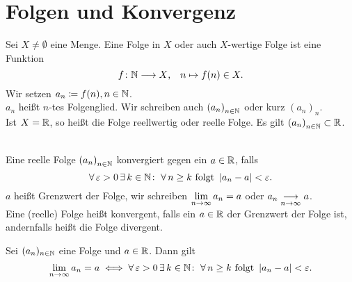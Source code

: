 \documentclass[../ana1.tex]{subfiles}
\begin{document}
\setcounter{section}{6}

\section{Folgen und Konvergenz}

\begin{defi}
	Sei \( X \neq \emptyset \) eine Menge. Eine Folge in \(X \) oder auch \(X \)-wertige Folge
	ist eine Funktion
	\[f \colon \mathbb{N} \longrightarrow X \text{,} \quad n \mapsto f(n) \in X. \]
	Wir setzen \(a_n \coloneqq f(n) \text{,} \, n \in \mathbb{N} \).\\
	\(a_n \) heißt \(n \)-tes Folgenglied. Wir schreiben auch \({(a_n)}_{n \in \mathbb{N}} \)
	oder kurz \({(a_n)}_n \).\\
	Ist \(X = \mathbb{R} \), so heißt die Folge reellwertig oder reelle Folge.
	Es gilt \({(a_n)}_{n\in\mathbb{N}} \subset \mathbb{R} \).
\end{defi}

\begin{defi} \leavevmode \\
	Eine reelle Folge \({(a_n)}_{n \in \mathbb{N}} \) konvergiert gegen ein \(a \in \mathbb{R} \), falls
	\[\forall \, \varepsilon > 0 \, \exists \, k \in \mathbb{N} \colon \; \forall \, n \geq k \text{ folgt } \left|a_n - a\right| < \varepsilon. \]
	\(a \) heißt Grenzwert der Folge, wir schreiben \(\lim\limits_{n\rightarrow\infty}a_n = a \) oder \(a_n \underset{n\rightarrow\infty}{\longrightarrow} a \).\\
	Eine (reelle) Folge heißt konvergent, falls ein \(a\in\mathbb{R} \) der Grenzwert
	der Folge ist, andernfalls heißt die Folge divergent.
\end{defi}

\begin{bem}
	Sei \((a_n)_{n \in \mathbb{N}} \) eine Folge und \(a \in \mathbb{R} \). Dann gilt
	\[\lim\limits_{n\rightarrow\infty}a_n = a \iff \forall \, \varepsilon > 0 \, \exists \, k \in \mathbb{N} \colon \; \forall \, n \geq k \text{ folgt } \left|a_n - a\right| < \varepsilon. \]
\end{bem}
\end{document}
